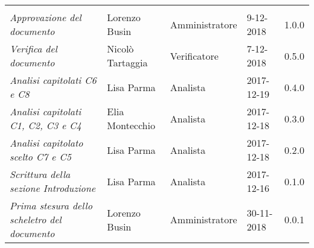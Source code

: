 \newpage 
\section*{}
\begin{table}[H]
	\centering
	\begin{tabular}{p{4cm}|C{3cm}|C{3cm}|R{2.5cm}|R{2cm}}
		
		 & & & & \\
		
		
		\emph{Approvazione del documento} & Lorenzo Busin & Amministratore & 9-12-2018 & 1.0.0 \\
		\hline
		
		\emph{Verifica del documento} & Nicolò Tartaggia & Verificatore & 7-12-2018 & 0.5.0 \\
		\hline
		
		\emph{Analisi capitolati C6 e C8 } & Lisa Parma & Analista & 2017-12-19 & 0.4.0 \\
		\hline
		
		\emph{Analisi capitolati C1, C2, C3 e C4 } & Elia Montecchio & Analista & 2017-12-18 & 0.3.0 \\
		\hline
		
		\emph{Analisi capitolato scelto C7 e C5 } & Lisa Parma & Analista & 2017-12-18 & 0.2.0 \\
		\hline
		
		\emph{Scrittura della sezione Introduzione } & Lisa Parma & Analista & 2017-12-16 & 0.1.0 \\
		\hline
		
		\emph{Prima stesura dello scheletro del documento} & Lorenzo Busin & Amministratore & 30-11-2018 & 0.0.1 \\
		
	\end{tabular}
	
\end{table}


\clearpage